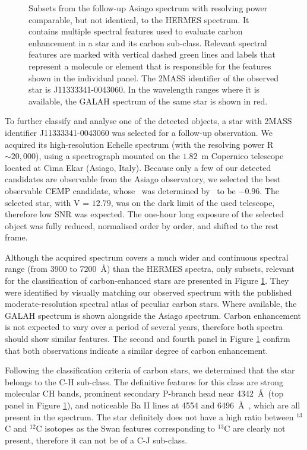 \begin{figure}
	\caption{Subsets from the follow-up Asiago spectrum with resolving power comparable, but not identical, to the HERMES spectrum. It contains multiple spectral features used to evaluate carbon enhancement in a star and its carbon sub-class. Relevant spectral features are marked with vertical dashed green lines and labels that represent a molecule or element that is responsible for the features shown in the individual panel. The 2MASS identifier of the observed star is J11333341-0043060. In the wavelength ranges where it is available, the GALAH spectrum of the same star is shown in red.}
	\label{fig:asiago}
\end{figure}

To further classify and analyse one of the detected objects, a star with 2MASS identifier J11333341-0043060 was selected for a follow-up observation. We acquired its high-resolution Echelle spectrum (with the resolving power R $\sim 20,000$), using a spectrograph mounted on the $1.82$~m Copernico telescope located at Cima Ekar (Asiago, Italy). Because only a few of our detected candidates are observable from the Asiago observatory, we selected the best observable CEMP candidate, whose \Feh\ was determined by \TC\ to be $-0.96$. The selected star, with V = $12.79$, was on the dark limit of the used telescope, therefore low SNR was expected. The one-hour long exposure of the selected object was fully reduced, normalised order by order, and shifted to the rest frame.

Although the acquired spectrum covers a much wider and continuous spectral range (from 3900 to 7200~\AA) than the HERMES spectra, only subsets, relevant for the classification of carbon-enhanced stars are presented in Figure \ref{fig:asiago}. They were identified by visually matching our observed spectrum with the published moderate-resolution spectral atlas \citep{1996ApJS..105..419B} of peculiar carbon stars. Where available, the GALAH spectrum is shown alongside the Asiago spectrum. Carbon enhancement is not expected to vary over a period of several years, therefore both spectra should show similar features. The second and fourth panel in Figure \ref{fig:asiago} confirm that both observations indicate a similar degree of carbon enhancement.

Following the classification criteria of carbon stars, we determined that the star belongs to the C-H sub-class. The definitive features for this class are strong molecular CH bands, prominent secondary P-branch head near 4342~\AA\ (top panel in Figure \ref{fig:asiago}), and noticeable Ba II lines at 4554 and 6496~\AA\ \citep{2018ApJS..234...31L}, which are all present in the spectrum. The star definitely does not have a high ratio between $^{13}$C and $^{12}$C isotopes as the Swan features corresponding to $^{13}$C are clearly not present, therefore it can not be of a C-J sub-class.

